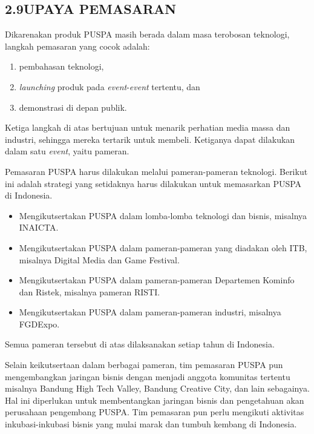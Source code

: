 \subsection*{\textsf{\normalsize 2.9\hspace{0.5cm}UPAYA PEMASARAN}}

Dikarenakan produk PUSPA masih berada dalam masa terobosan teknologi, langkah pemasaran yang cocok adalah:
\begin{enumerate}
	\item pembahasan teknologi,
	\item \textit{launching} produk pada \textit{event}-\textit{event} tertentu, dan
	\item demonstrasi di depan publik.
\end{enumerate}
Ketiga langkah di atas bertujuan untuk menarik perhatian media massa dan industri, sehingga mereka tertarik untuk membeli. Ketiganya dapat dilakukan dalam satu \textit{event}, yaitu pameran.

Pemasaran PUSPA harus dilakukan melalui pameran-pameran teknologi. Berikut ini adalah strategi yang setidaknya harus dilakukan untuk memasarkan PUSPA di Indonesia.
\begin{itemize}
	\item Mengikutsertakan PUSPA dalam lomba-lomba teknologi dan bisnis, misalnya INAICTA.
	\item Mengikutsertakan PUSPA dalam pameran-pameran yang diadakan oleh ITB, misalnya Digital Media dan Game Festival.
	\item Mengikutsertakan PUSPA dalam pameran-pameran Departemen Kominfo dan Ristek, misalnya pameran RISTI.
	\item Mengikutsertakan PUSPA dalam pameran-pameran industri, misalnya FGDExpo.
\end{itemize}
Semua pameran tersebut di atas dilaksanakan setiap tahun di Indonesia.

Selain keikutsertaan dalam berbagai pameran, tim pemasaran PUSPA pun mengembangkan jaringan bisnis dengan menjadi anggota komunitas tertentu misalnya Bandung High Tech Valley, Bandung Creative City, dan lain sebagainya. Hal ini diperlukan untuk membentangkan jaringan bisnis dan pengetahuan akan perusahaan pengembang PUSPA. Tim pemasaran pun perlu mengikuti aktivitas inkubasi-inkubasi bisnis yang mulai marak dan tumbuh kembang di Indonesia.
